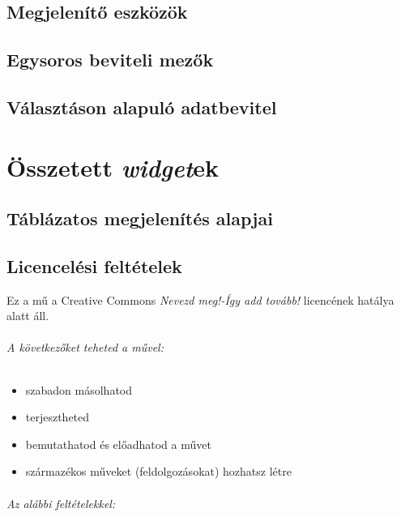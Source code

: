 \documentclass[a4paper, titlepage]{report}
\begin{document}
\chapter{Megjelenítő eszközök}


\chapter{Egysoros beviteli mezők}


\chapter{Választáson alapuló adatbevitel}


\part{Összetett \textit{widget}ek}

\chapter{Táblázatos megjelenítés alapjai}


\appendix

\chapter{Licencelési feltételek}

Ez a mű a Creative Commons \textit{Nevezd meg!-Így add tovább!} licencének hatálya alatt áll.

\paragraph{A következőket teheted a művel:}

\begin{itemize}
 \item szabadon másolhatod
 \item terjesztheted
 \item bemutathatod és előadhatod a művet 
 \item származékos műveket (feldolgozásokat) hozhatsz létre
\end{itemize}

\paragraph{Az alábbi feltételekkel:}
\end{document}
